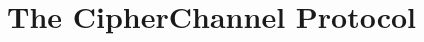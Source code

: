 \documentclass[journal]{IEEEtran}
\begin{document}

\section{The CipherChannel Protocol}
\label{sec:protocol}
\end{document}
